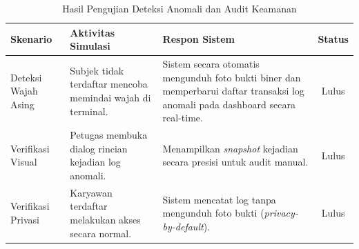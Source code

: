 \begin{table}[t]
\centering
\caption{Hasil Pengujian Deteksi Anomali dan Audit Keamanan}
\label{tab:test_security}
\begin{tabular}{|l|p{5.2cm}|p{3.5cm}|c|}
\hline
\textbf{Skenario} & \textbf{Aktivitas Simulasi} & \textbf{Respon Sistem} & \textbf{Status} \\ \hline
Deteksi Wajah Asing & Subjek tidak terdaftar mencoba memindai wajah di terminal. & Sistem secara otomatis mengunduh foto bukti biner dan memperbarui daftar transaksi log anomali pada dashboard secara real-time. & Lulus \\ \hline
Verifikasi Visual & Petugas membuka dialog rincian kejadian log anomali. & Menampilkan \textit{snapshot} kejadian secara presisi untuk audit manual. & Lulus \\ \hline
Verifikasi Privasi & Karyawan terdaftar melakukan akses secara normal. & Sistem mencatat log tanpa mengunduh foto bukti (\textit{privacy-by-default}). & Lulus \\ \hline
\end{tabular}
\end{table}
